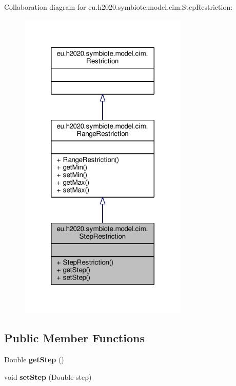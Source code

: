 Collaboration diagram for eu.\+h2020.\+symbiote.\+model.\+cim.\+Step\+Restriction\+:\nopagebreak
\begin{figure}[H]
\begin{center}
\leavevmode
\includegraphics[width=228pt]{classeu_1_1h2020_1_1symbiote_1_1model_1_1cim_1_1StepRestriction__coll__graph}
\end{center}
\end{figure}
\subsection*{Public Member Functions}
\begin{DoxyCompactItemize}
\item 
\mbox{\label{classeu_1_1h2020_1_1symbiote_1_1model_1_1cim_1_1StepRestriction_a7f33fe6a7a031b879c819d4c1dc530fa}} 
Double {\bfseries get\+Step} ()
\item 
\mbox{\label{classeu_1_1h2020_1_1symbiote_1_1model_1_1cim_1_1StepRestriction_a68f42e97b69916abd218194e929ae1d4}} 
void {\bfseries set\+Step} (Double step)
\end{DoxyCompactItemize}


